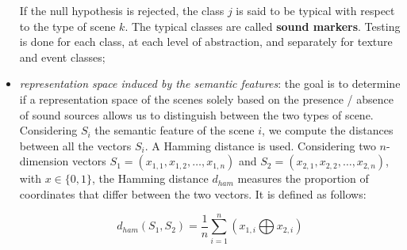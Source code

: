\documentclass[12pt]{elsarticle}
\begin{document}
\begin{itemize}
If the null hypothesis is rejected, the class $j$ is said to be typical with respect to the type of scene $k$. The typical classes are called \textbf{sound markers}. Testing is done for each class, at each level of abstraction, and separately for texture and event classes;


\item \emph{representation space induced by the semantic features}: the goal is to determine if a representation space of the scenes solely based on the presence / absence of sound sources allows us to distinguish between the two types of scene. Considering $S_i$ the semantic feature of the scene $i$, we compute the distances between all the vectors $S_i$. A Hamming distance is used. Considering two $n$-dimension vectors $S_1=(x_{1,1},x_{1,2},\ldots,x_{1,n})$ and $S_2=(x_{2,1},x_{2,2},\ldots,x_{2,n})$, with $x \in\lbrace 0,1\rbrace$, the Hamming distance $d_{ham}$ measures the proportion of coordinates that differ between the two vectors. It is defined as follows:

\begin{equation}
d_{ham}(S_1,S_2)=\dfrac{1}{n}\sum_{i=1}^{n} (x_{1,i} \bigoplus x_{2,i})
\end{equation}



\end{itemize}
\end{document}
